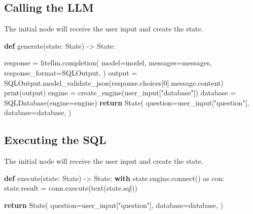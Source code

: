 \documentclass[
  letterpaper,
  DIV=11,
  numbers=noendperiod]{scrartcl}
\newenvironment{Shaded}{\begin{snugshade}}{\end{snugshade}}
\newcommand{\BuiltInTok}[1]{\textcolor[rgb]{0.00,0.23,0.31}{#1}}
\newcommand{\ControlFlowTok}[1]{\textcolor[rgb]{0.00,0.23,0.31}{\textbf{#1}}}
\newcommand{\DecValTok}[1]{\textcolor[rgb]{0.68,0.00,0.00}{#1}}
\newcommand{\ExtensionTok}[1]{\textcolor[rgb]{0.00,0.23,0.31}{#1}}
\newcommand{\ImportTok}[1]{\textcolor[rgb]{0.00,0.46,0.62}{#1}}
\newcommand{\KeywordTok}[1]{\textcolor[rgb]{0.00,0.23,0.31}{\textbf{#1}}}
\newcommand{\NormalTok}[1]{\textcolor[rgb]{0.00,0.23,0.31}{#1}}
\newcommand{\OperatorTok}[1]{\textcolor[rgb]{0.37,0.37,0.37}{#1}}
\newcommand{\StringTok}[1]{\textcolor[rgb]{0.13,0.47,0.30}{#1}}
\begin{document}
\subsection{Calling the LLM}\label{calling-the-llm}

The initial node will receive the user input and create the state.

\begin{Shaded}
\begin{Highlighting}[]
\KeywordTok{def}\NormalTok{ generate(state: State) }\OperatorTok{{-}\textgreater{}}\NormalTok{ State:}

\NormalTok{  response }\OperatorTok{=}\NormalTok{ litellm.completion(}
\NormalTok{    model}\OperatorTok{=}\NormalTok{model,}
\NormalTok{    messages}\OperatorTok{=}\NormalTok{messages,}
\NormalTok{    response\_format}\OperatorTok{=}\NormalTok{SQLOutput,}
\NormalTok{  )}
\NormalTok{  output }\OperatorTok{=}\NormalTok{ SQLOutput.model\_validate\_json(response.choices[}\DecValTok{0}\NormalTok{].message.content)}
  \BuiltInTok{print}\NormalTok{(output)}
\NormalTok{  engine }\OperatorTok{=}\NormalTok{ create\_engine(user\_input[}\StringTok{"database"}\NormalTok{])}
\NormalTok{  database }\OperatorTok{=}\NormalTok{ SQLDatabase(engine}\OperatorTok{=}\NormalTok{engine)}
  \ControlFlowTok{return}\NormalTok{ State(}
\NormalTok{    question}\OperatorTok{=}\NormalTok{user\_input[}\StringTok{"question"}\NormalTok{], }
\NormalTok{    database}\OperatorTok{=}\NormalTok{database,}
\NormalTok{  )}
\end{Highlighting}
\end{Shaded}

\subsection{Executing the SQL}\label{executing-the-sql}

The initial node will receive the user input and create the state.

\begin{Shaded}
\begin{Highlighting}[]
\KeywordTok{def}\NormalTok{ execute(state: State) }\OperatorTok{{-}\textgreater{}}\NormalTok{ State:}
  \ControlFlowTok{with}\NormalTok{ state.engine.}\ExtensionTok{connect}\NormalTok{() }\ImportTok{as}\NormalTok{ con:}
\NormalTok{    state.result }\OperatorTok{=}\NormalTok{ conn.execute(text(state.sql))}
  
  \ControlFlowTok{return}\NormalTok{ State(}
\NormalTok{    question}\OperatorTok{=}\NormalTok{user\_input[}\StringTok{"question"}\NormalTok{], }
\NormalTok{    database}\OperatorTok{=}\NormalTok{database,}
\NormalTok{  )}
\end{Highlighting}
\end{Shaded}
\end{document}
